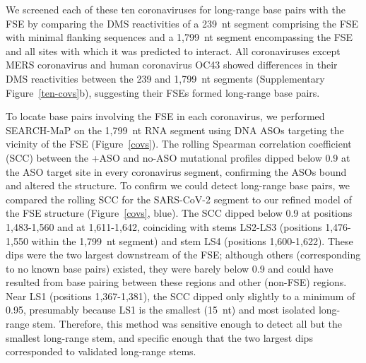 \documentclass[main.tex]{subfiles}
\begin{document}
We screened each of these ten coronaviruses for long-range base pairs with the FSE by comparing the DMS reactivities of a 239~nt segment comprising the FSE with minimal flanking sequences and a 1,799~nt segment encompassing the FSE and all sites with which it was predicted to interact.
All coronaviruses except MERS coronavirus and human coronavirus OC43 showed differences in their DMS reactivities between the 239 and 1,799~nt segments (Supplementary Figure~\ref{ten-covs}b), suggesting their FSEs formed long-range base pairs.

To locate base pairs involving the FSE in each coronavirus, we performed SEARCH-MaP on the 1,799~nt RNA segment using DNA ASOs targeting the vicinity of the FSE (Figure~\ref{covs}).
The rolling Spearman correlation coefficient (SCC) between the +ASO and no-ASO mutational profiles dipped below 0.9 at the ASO target site in every coronavirus segment, confirming the ASOs bound and altered the structure.
To confirm we could detect long-range base pairs, we compared the rolling SCC for the SARS-CoV-2 segment to our refined model of the FSE structure (Figure~\ref{covs}, blue).
The SCC dipped below 0.9 at positions 1,483-1,560 and at 1,611-1,642, coinciding with stems LS2-LS3 (positions 1,476-1,550 within the 1,799~nt segment) and stem LS4 (positions 1,600-1,622).
These dips were the two largest downstream of the FSE; although others (corresponding to no known base pairs) existed, they were barely below 0.9 and could have resulted from base pairing between these regions and other (non-FSE) regions.
Near LS1 (positions 1,367-1,381), the SCC dipped only slightly to a minimum of 0.95, presumably because LS1 is the smallest (15~nt) and most isolated long-range stem.
Therefore, this method was sensitive enough to detect all but the smallest long-range stem, and specific enough that the two largest dips corresponded to validated long-range stems.
\end{document}
